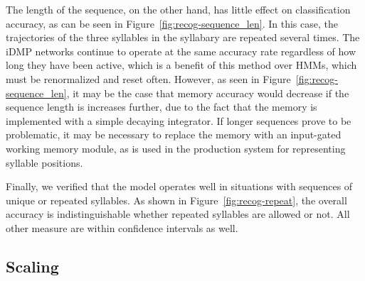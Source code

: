 
The length of the sequence,
on the other hand,
has little effect on classification accuracy,
as can be seen in Figure~\ref{fig:recog-sequence_len}.
In this case, the trajectories
of the three syllables in the syllabary
are repeated several times.
The iDMP networks continue to operate
at the same accuracy rate
regardless of how long they have been active,
which is a benefit of this method
over HMMs, which must be renormalized
and reset often.
However, as seen in Figure~\ref{fig:recog-sequence_len},
it may be the case that memory accuracy
would decrease if the sequence length
is increases further,
due to the fact that the memory
is implemented with a simple decaying integrator.
If longer sequences prove to be problematic,
it may be necessary to replace the memory
with an input-gated working memory module,
as is used in the production system
for representing syllable positions.


Finally, we verified that the model
operates well in situations with
sequences of unique or repeated syllables.
As shown in Figure~\ref{fig:recog-repeat},
the overall accuracy is indistinguishable
whether repeated syllables are allowed or not.
All other measure are within confidence intervals as well.

\subsection{Scaling}

